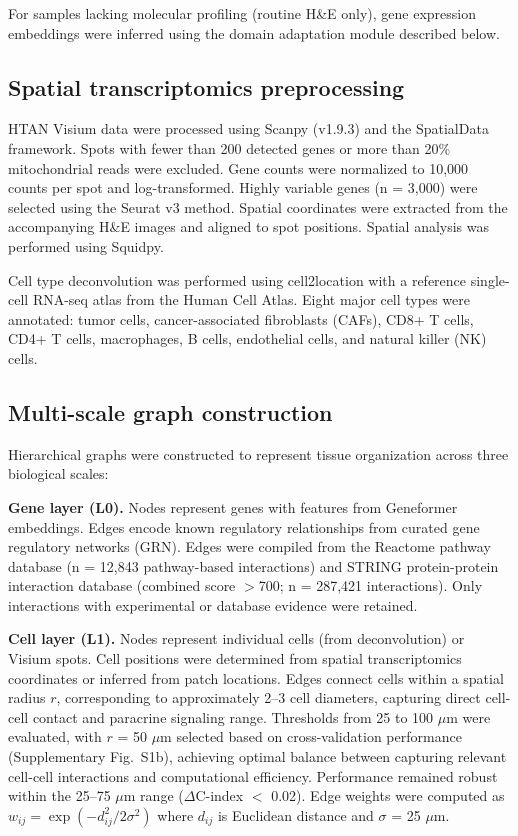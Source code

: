 \documentclass[pdflatex,sn-nature]{sn-jnl}%
\theoremstyle{thmstyleone}%
\theoremstyle{thmstyletwo}%
\theoremstyle{thmstylethree}%
\begin{document}
For samples lacking molecular profiling (routine H\&E only), gene expression embeddings were inferred using the domain adaptation module described below.

\subsection{Spatial transcriptomics preprocessing}

HTAN Visium data were processed using Scanpy (v1.9.3)\cite{bib27} and the SpatialData framework\cite{bib72}. Spots with fewer than 200 detected genes or more than 20\% mitochondrial reads were excluded. Gene counts were normalized to 10,000 counts per spot and log-transformed. Highly variable genes (n = 3,000) were selected using the Seurat v3 method. Spatial coordinates were extracted from the accompanying H\&E images and aligned to spot positions. Spatial analysis was performed using Squidpy\cite{bib61}.

Cell type deconvolution was performed using cell2location\cite{bib28} with a reference single-cell RNA-seq atlas from the Human Cell Atlas. Eight major cell types were annotated: tumor cells, cancer-associated fibroblasts (CAFs), CD8+ T cells, CD4+ T cells, macrophages, B cells, endothelial cells, and natural killer (NK) cells.

\subsection{Multi-scale graph construction}

Hierarchical graphs were constructed to represent tissue organization across three biological scales:

\textbf{Gene layer (L0).} Nodes represent genes with features from Geneformer embeddings. Edges encode known regulatory relationships from curated gene regulatory networks (GRN). Edges were compiled from the Reactome pathway database\cite{bib17} (n = 12,843 pathway-based interactions) and STRING protein-protein interaction database\cite{bib16} (combined score $>$700; n = 287,421 interactions). Only interactions with experimental or database evidence were retained.

\textbf{Cell layer (L1).} Nodes represent individual cells (from deconvolution) or Visium spots. Cell positions were determined from spatial transcriptomics coordinates or inferred from patch locations\cite{bib57}. Edges connect cells within a spatial radius $r$, corresponding to approximately 2--3 cell diameters, capturing direct cell-cell contact and paracrine signaling range. Thresholds from 25 to 100 $\mu$m were evaluated, with $r$ = 50 $\mu$m selected based on cross-validation performance (Supplementary Fig.~S1b), achieving optimal balance between capturing relevant cell-cell interactions and computational efficiency. Performance remained robust within the 25--75 $\mu$m range ($\Delta$C-index $<$ 0.02). Edge weights were computed as $w_{ij} = \exp(-d_{ij}^2 / 2\sigma^2)$ where $d_{ij}$ is Euclidean distance and $\sigma$ = 25 $\mu$m.
\end{document}
